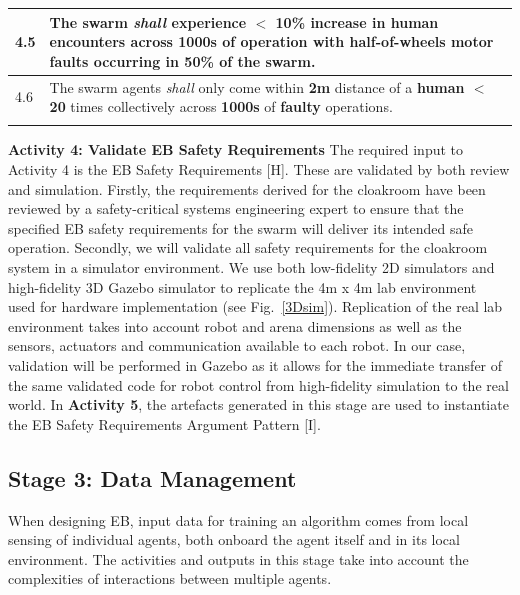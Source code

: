 \documentclass[runningheads]{llncs}
\begin{document}
\begin{table}[!t]
\begin{tabular}{p{5mm} p{125mm} }
		\hline
		4.5 & The swarm \emph{shall} experience \textbf{$<$ 10\%} increase in \textbf{human encounters }across \textbf{1000s} of operation with \textbf{half-of-wheels motor faults} occurring in \textbf{50\%} of the swarm.\\
		\hline
		4.6 & The swarm agents \emph{shall} only come within \textbf{2m} distance of a \textbf{human $<$ 20} times collectively across \textbf{1000s} of \textbf{faulty} operations.
		\\				
		\hline \\[-1\medskipamount]		
	\end{tabular}
	\vspace{-4ex}
\end{table}
\noindent\textbf{Activity 4: Validate EB Safety Requirements} The required input to Activity 4 is the EB Safety Requirements [H].  
These are validated by both review and simulation.
Firstly, the requirements derived for the cloakroom have been reviewed by a safety-critical systems engineering expert to ensure that the specified EB safety requirements for the swarm will deliver its intended safe operation. Secondly, we will validate all safety requirements for the cloakroom system in a simulator environment. We use both low-fidelity 2D simulators and high-fidelity 3D Gazebo simulator to replicate the 4m x 4m lab environment~\cite{Jones2022} used for hardware implementation (see Fig.~\ref{3Dsim}). Replication of the real lab environment takes into account robot and arena dimensions as well as the sensors, actuators and communication available to each robot. In our case, validation will be performed in Gazebo as it allows for the immediate transfer of the same validated code for robot control from high-fidelity simulation to the real world. 
In \textbf{Activity 5}, the artefacts generated in this stage are used to instantiate the EB Safety Requirements Argument Pattern [I].  

\subsection{Stage 3: Data Management} \label{framework-stage3}
When designing EB, input data for training an algorithm comes from local sensing of individual agents, both onboard the agent itself and in its local environment. The activities and outputs in this stage take into account the complexities of interactions between multiple agents.
\end{document}
